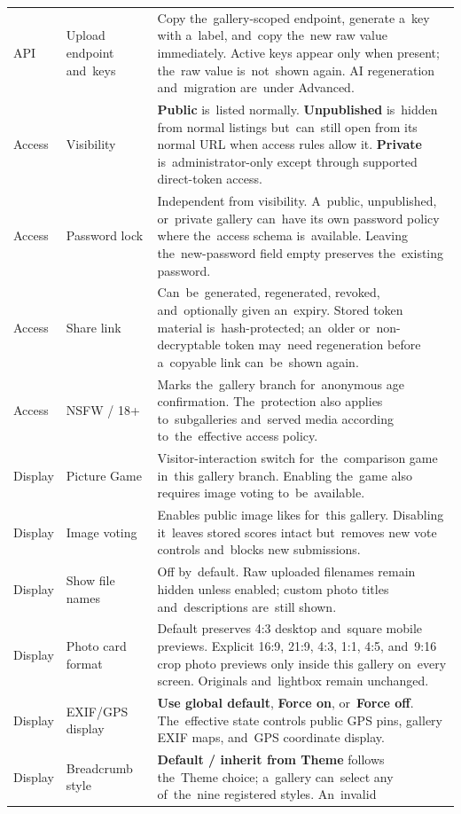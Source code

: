 \documentclass[11pt,a4paper]{article}
\newcommand{\ui}[1]{\textbf{#1}}
\begin{document}
\begin{longtable}{%
    >{\raggedright\arraybackslash}p{}%
    >{\raggedright\arraybackslash}p{}%
    >{\raggedright\arraybackslash}p{}%
}
API & Upload endpoint and~keys & Copy the~gallery-scoped endpoint, generate
a~key with a~label, and~copy the~new raw value immediately. Active keys appear
only when present; the~raw value is~not~shown again. AI regeneration
and~migration are~under Advanced.\\
Access & Visibility & \ui{Public} is~listed normally. \ui{Unpublished} is~hidden
from normal listings but~can~still open from its normal URL when access rules
allow it. \ui{Private} is~administrator-only except through supported
direct-token access.\\
Access & Password lock & Independent from visibility. A~public, unpublished,
or~private gallery can~have its own password policy where the~access schema
is~available. Leaving the~new-password field empty preserves the~existing
password.\\
Access & Share link & Can~be~generated, regenerated, revoked, and~optionally
given an~expiry. Stored token material is~hash-protected; an~older
or~non-decryptable token may~need regeneration before a~copyable link
can~be~shown again.\\
Access & NSFW / 18+ & Marks the~gallery branch for~anonymous age confirmation.
The~protection also applies to~subgalleries and~served media according
to~the~effective access policy.\\
Display & Picture Game & Visitor-interaction switch for~the~comparison game
in~this gallery branch. Enabling the~game also requires image voting
to~be~available.\\
Display & Image voting & Enables public image likes for~this gallery. Disabling
it~leaves stored scores intact but~removes new vote controls and~blocks new
submissions.\\
Display & Show file names & Off by~default. Raw uploaded filenames remain hidden
unless enabled; custom photo titles and~descriptions are~still shown.\\
Display & Photo card format & Default preserves 4:3 desktop and~square mobile
previews. Explicit 16:9, 21:9, 4:3, 1:1, 4:5, and~9:16 crop photo previews only
inside this gallery on~every screen. Originals and~lightbox remain unchanged.\\
Display & EXIF/GPS display & \ui{Use global default}, \ui{Force on},
or~\ui{Force off}. The~effective state controls public GPS pins, gallery EXIF
maps, and~GPS coordinate display.\\
Display & Breadcrumb style & \ui{Default / inherit from Theme} follows the~Theme
choice; a~gallery can~select any of~the~nine registered styles. An~invalid

\end{longtable}
\end{document}
